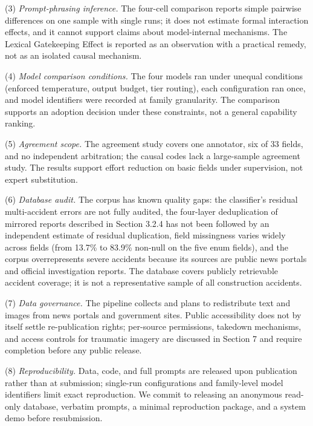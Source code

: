 \documentclass[11pt]{article}
\begin{document}
(3) \textit{Prompt-phrasing inference.} The four-cell comparison reports simple pairwise differences on one sample with single runs; it does not estimate formal interaction effects, and it cannot support claims about model-internal mechanisms. The Lexical Gatekeeping Effect is reported as an observation with a practical remedy, not as an isolated causal mechanism.

(4) \textit{Model comparison conditions.} The four models ran under unequal conditions (enforced temperature, output budget, tier routing), each configuration ran once, and model identifiers were recorded at family granularity. The comparison supports an adoption decision under these constraints, not a general capability ranking.

(5) \textit{Agreement scope.} The agreement study covers one annotator, six of 33 fields, and no independent arbitration; the causal codes lack a large-sample agreement study. The results support effort reduction on basic fields under supervision, not expert substitution.

(6) \textit{Database audit.} The corpus has known quality gaps: the classifier's residual multi-accident errors are not fully audited, the four-layer deduplication of mirrored reports described in Section 3.2.4 has not been followed by an independent estimate of residual duplication, field missingness varies widely across fields (from 13.7\% to 83.9\% non-null on the five enum fields), and the corpus overrepresents severe accidents because its sources are public news portals and official investigation reports. The database covers publicly retrievable accident coverage; it is not a representative sample of all construction accidents.

(7) \textit{Data governance.} The pipeline collects and plans to redistribute text and images from news portals and government sites. Public accessibility does not by itself settle re-publication rights; per-source permissions, takedown mechanisms, and access controls for traumatic imagery are discussed in Section 7 and require completion before any public release.

(8) \textit{Reproducibility.} Data, code, and full prompts are released upon publication rather than at submission; single-run configurations and family-level model identifiers limit exact reproduction. We commit to releasing an anonymous read-only database, verbatim prompts, a minimal reproduction package, and a system demo before resubmission.
\end{document}
